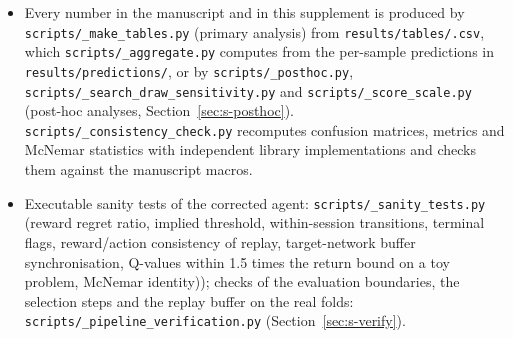 \begin{itemize}
\item Every number in the manuscript and in this supplement is produced by \texttt{scripts/\_make\_tables.py} (primary analysis) from \texttt{results/\allowbreak tables/\allowbreak *.csv}, which \texttt{scripts/\_aggregate.py} computes from the per-sample predictions in \texttt{results/\allowbreak predictions/\allowbreak }, or by \texttt{scripts/\_posthoc.py}, \texttt{scripts/\_search\_draw\_sensitivity.py} and \texttt{scripts/\_score\_scale.py} (post-hoc analyses, Section~\ref{sec:s-posthoc}). \texttt{scripts/\_consistency\_check.py} recomputes confusion matrices, metrics and McNemar statistics with independent library implementations and checks them against the manuscript macros.
\item Executable sanity tests of the corrected agent: \texttt{scripts/\_sanity\_tests.py} (reward regret ratio, implied threshold, within-session transitions, terminal flags, reward/action consistency of replay, target-network buffer synchronisation, Q-values within 1.5 times the return bound on a toy problem, McNemar identity)); checks of the evaluation boundaries, the selection steps and the replay buffer on the real folds: \texttt{scripts/\_pipeline\_verification.py} (Section~\ref{sec:s-verify}).
\end{itemize}
